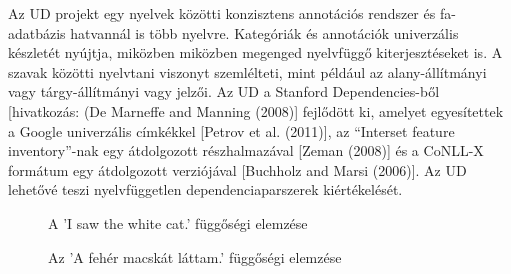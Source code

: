 Az UD projekt egy nyelvek közötti konzisztens annotációs rendszer és fa-adatbázis hatvannál is több nyelvre. Kategóriák és annotációk univerzális készletét nyújtja, miközben miközben megenged nyelvfüggő kiterjesztéseket is. A szavak közötti nyelvtani viszonyt szemlélteti, mint például az alany-állítmányi vagy tárgy-állítmányi vagy jelzői. Az UD a Stanford Dependencies-ből [hivatkozás: (De Marneffe and Manning (2008)] fejlődött ki, amelyet egyesítettek a Google univerzális címkékkel [Petrov et al. (2011)], az “Interset feature inventory”-nak egy átdolgozott részhalmazával [Zeman (2008)] és  a CoNLL-X formátum egy átdolgozott verziójával [Buchholz and
Marsi (2006)]. Az UD lehetővé teszi nyelvfüggetlen dependenciaparszerek kiértékelését.

\begin{figure}[h]
\centering 
{}
\caption{A 'I saw the white cat.' függőségi elemzése}
\label{fig:deptreeEN}  
\end{figure}

\begin{figure}[h]
\centering 
{}
\caption{Az 'A fehér macskát láttam.' függőségi elemzése }
\label{fig:deptreeHU}  
\end{figure}

